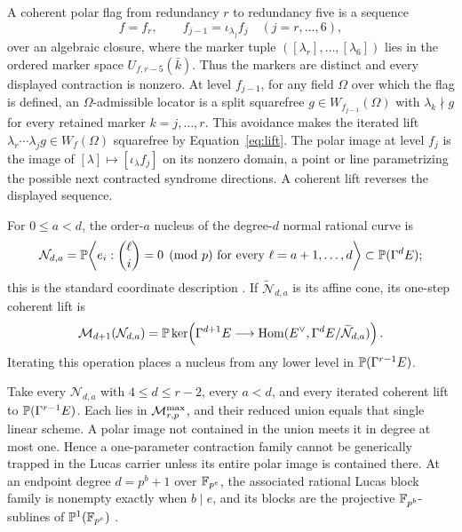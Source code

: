 \begin{definition}
A coherent polar flag from redundancy \(r\) to redundancy five is a sequence
\[
 f=f_r,\qquad f_{j-1}=\iota_{\lambda_j}f_j
 \quad (j=r,\ldots,6),
\]
over an algebraic closure, where the marker tuple
\(([\lambda_r],\ldots,[\lambda_6])\) lies in the ordered marker space
\(U_{f,r-5}(\bar k)\).  Thus the markers are distinct and every displayed
contraction is nonzero.  At level \(f_{j-1}\),
for any field \(\Omega\) over which the flag is defined, an
\(\Omega\)-admissible locator is a split squarefree
\(g\in W_{f_{j-1}}(\Omega)\) with \(\lambda_k\nmid g\) for
every retained marker \(k=j,\ldots,r\).  This avoidance makes the iterated lift
\(\lambda_r\cdots\lambda_jg\in W_f(\Omega)\) squarefree by
Equation~\eqref{eq:lift}.  The polar image at level \(f_j\) is the image of
\([\lambda]\mapsto[\iota_\lambda f_j]\) on its nonzero domain, a point or line
parametrizing the possible next contracted syndrome directions.  A coherent
lift reverses the displayed sequence.
\end{definition}

For \(0\leq a<d\), the order-\(a\) nucleus of the degree-\(d\) normal
rational curve is
\[
 \mathcal N_{d,a}
 =\mathbb P\!\left\langle e_i:
   \binom{\ell}{i}=0\pmod p
   \text{ for every }\ell=a+1,\ldots,d\right\rangle
 \subset\mathbb P(\Gamma^dE);
\]
this is the standard coordinate description
\cite{GmainerHavlicek2013}.  If \(\widetilde{\mathcal N}_{d,a}\) is its affine
cone, its one-step coherent lift is
\[
 \mathcal M_{d+1}(\mathcal N_{d,a})
 =\mathbb P\ker\!\left(\Gamma^{d+1}E\longrightarrow
 \operatorname{Hom}(E^\vee,\Gamma^dE/\widetilde{\mathcal N}_{d,a})\right).
\]
Iterating this operation places a nucleus from any lower level in
\(\mathbb P(\Gamma^{r-1}E)\).

\begin{proposition}\label{prop:maximal-lucas-union}%
%
%
Take every \(\mathcal N_{d,a}\) with \(4\leq d\leq r-2\), every \(a<d\),
and every iterated coherent lift to \(\mathbb P(\Gamma^{r-1}E)\).  Each lies in
\(\mathcal M^{\max}_{r,p}\), and their reduced union equals that single linear
scheme.  A polar image not contained in the union meets it in degree at most
one.  Hence a one-parameter contraction family cannot be generically trapped
in the Lucas carrier unless its entire polar image is contained there.  At an
endpoint degree \(d=p^b+1\) over \(\mathbb F_{p^e}\), the associated rational Lucas
block family is nonempty exactly when \(b\mid e\), and its blocks are the
projective \(\mathbb F_{p^b}\)-sublines of \(\mathbb P^1(\mathbb F_{p^e})\)
\cite[Prop.~11]{WangWuHu2026}.
\end{proposition}

